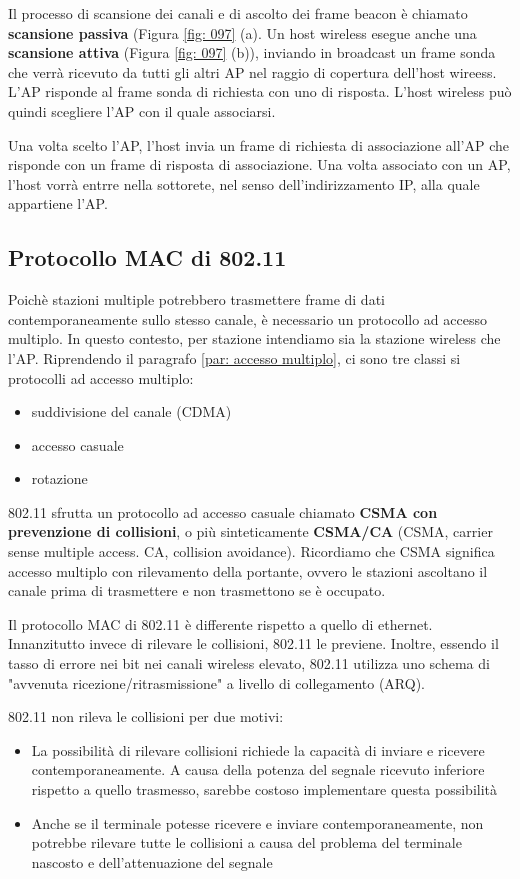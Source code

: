 \documentclass[11pt,a4paper]{book}
\begin{document}
Il processo di scansione dei canali e di ascolto dei frame beacon è chiamato \textbf{scansione passiva} (Figura \ref{fig: 097} (a). Un host wireless esegue anche una \textbf{scansione attiva} (Figura \ref{fig: 097} (b)), inviando in broadcast un frame sonda che verrà ricevuto da tutti gli altri AP nel raggio di copertura dell'host wireess. L'AP risponde al frame sonda di richiesta con uno di risposta. L'host wireless può quindi scegliere l'AP con il quale associarsi. 

Una volta scelto l'AP, l'host invia un frame di richiesta di associazione all'AP che risponde con un frame di risposta di associazione. Una volta associato con un AP, l'host vorrà entrre nella sottorete, nel senso dell'indirizzamento IP, alla quale appartiene l'AP.

\subsection{Protocollo MAC di 802.11}
Poichè stazioni multiple potrebbero trasmettere frame di dati contemporaneamente sullo stesso canale, è necessario un protocollo ad accesso multiplo. In questo contesto, per stazione intendiamo sia la stazione wireless che l'AP. Riprendendo il paragrafo \ref{par: accesso multiplo}, ci sono tre classi si protocolli ad accesso multiplo:
\begin{itemize}
	\item suddivisione del canale (CDMA)
	\item accesso casuale
	\item rotazione
\end{itemize}
802.11 sfrutta un protocollo ad accesso casuale chiamato \textbf{CSMA con prevenzione di collisioni}, o più sinteticamente \textbf{CSMA/CA} (CSMA, carrier sense multiple access. CA, collision avoidance). Ricordiamo che CSMA significa accesso multiplo con rilevamento della portante, ovvero le stazioni ascoltano il canale prima di trasmettere e non trasmettono se è occupato.

Il protocollo MAC di 802.11 è differente rispetto a quello di ethernet. Innanzitutto invece di rilevare le collisioni, 802.11 le previene. Inoltre, essendo il tasso di errore nei bit nei canali wireless elevato, 802.11 utilizza uno schema di "avvenuta ricezione/ritrasmissione"  a livello di collegamento (ARQ).

802.11 non rileva le collisioni per due motivi:
\begin{itemize}
	\item La possibilità di rilevare collisioni richiede la capacità di inviare e ricevere contemporaneamente. A causa della potenza del segnale ricevuto inferiore rispetto a quello trasmesso, sarebbe costoso implementare questa possibilità
	\item Anche se il terminale potesse ricevere e inviare contemporaneamente, non potrebbe rilevare tutte le collisioni a causa del problema del terminale nascosto e dell'attenuazione del segnale
\end{itemize}
\end{document}
